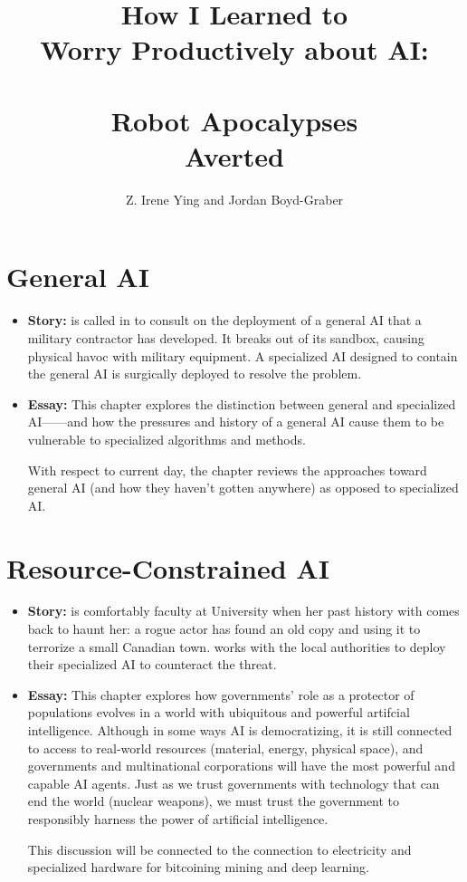 \documentclass[bfivepaper,twosided,justified,nobib]{tufte-book}
\title{How I Learned to \\ Worry Productively about AI: \\  \\ Robot Apocalypses \\ Averted}
\author{Z. Irene Ying and Jordan Boyd-Graber}
\begin{document}

\frontmatter









%

\newcommand{\outline}[3]{\chapter{#1}
  \begin{itemize}
  \item {\bf Story:} #2
  \item {\bf Essay:} #3
  \end{itemize}
}

\outline{General AI}{\lastname{} is called in to consult on the
  deployment of a general AI that a military contractor has developed.
  It breaks out of its sandbox, causing physical havoc with military
  equipment.  A specialized AI designed to contain the general AI is
  surgically deployed to resolve the problem.}{This chapter explores
  the distinction between general and specialized
  AI---\specializedai{}---and how the pressures and history of a
  general AI cause them to be vulnerable to specialized algorithms and
  methods.

  With respect to current day, the chapter reviews the approaches
  toward general AI (and how they haven't gotten anywhere) as opposed
  to specialized AI.  }

\outline{Resource-Constrained AI}{\lastname{} is comfortably faculty
  at University when her past history with \specializedai{} comes back
  to haunt her: a rogue actor has found an old copy and using it to
  terrorize a small Canadian town.  \lastname{} works with the local
  authorities to deploy their specialized AI to counteract the
  threat.}{This chapter explores how governments' role as a protector
  of populations evolves in a world with ubiquitous and powerful
  artifcial intelligence.  Although in some ways AI is democratizing,
  it is still connected to access to real-world resources (material,
  energy, physical space), and governments and multinational
  corporations will have the most powerful and capable AI agents.
  Just as we trust governments with technology that can end the world
  (nuclear weapons), we must trust the government to responsibly
  harness the power of artificial intelligence.

  This discussion will be connected to the connection to electricity
  and specialized hardware for bitcoining mining and deep learning.  }
\end{document}
